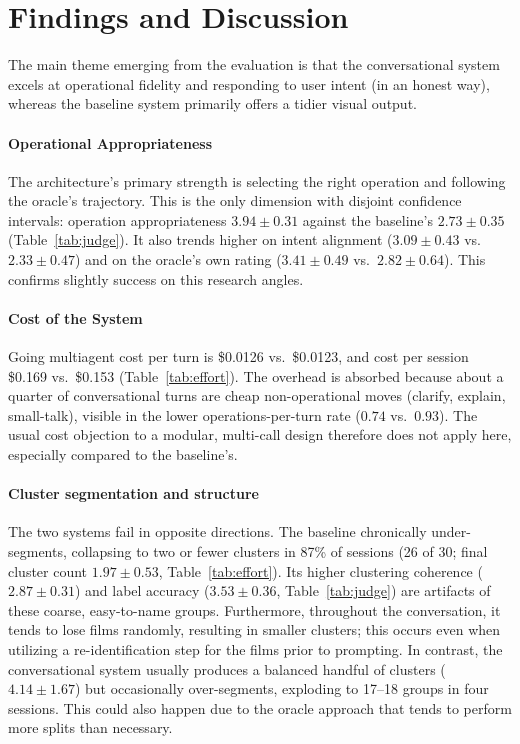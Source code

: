 \section{Findings and Discussion}\label{sec:findings}
The main theme emerging from the evaluation is that the conversational system excels at operational fidelity and responding to user intent (in an honest way), whereas the baseline system primarily offers a tidier visual output.

\paragraph{Operational Appropriateness}
The architecture's primary strength is selecting the right operation and following the oracle's trajectory.
This is the only dimension with disjoint confidence intervals: operation appropriateness $3.94\pm0.31$ against the baseline's $2.73\pm0.35$ (Table~\ref{tab:judge}).
It also trends higher on intent alignment ($3.09\pm0.43$ vs.\ $2.33\pm0.47$) and on the oracle's own rating ($3.41\pm0.49$ vs.\ $2.82\pm0.64$).
This confirms slightly success on this research angles.

\paragraph{Cost of the System}
Going multiagent cost per turn is \$0.0126 vs.\ \$0.0123, and cost per session \$0.169 vs.\ \$0.153 (Table~\ref{tab:effort}).
The overhead is absorbed because about a quarter of conversational turns are cheap non-operational moves (clarify, explain, small-talk), visible in the lower operations-per-turn rate ($0.74$ vs.\ $0.93$).
The usual cost objection to a modular, multi-call design therefore does not apply here, especially compared to the baseline's.

\paragraph{Cluster segmentation and structure}
The two systems fail in opposite directions. 
The baseline chronically under-segments, collapsing to two or fewer clusters in 87\% of sessions (26 of 30; final cluster count $1.97 \pm 0.53$, Table~\ref{tab:effort}). 
Its higher clustering coherence ($2.87 \pm 0.31$) and label accuracy ($3.53 \pm 0.36$, Table~\ref{tab:judge}) are artifacts of these coarse, easy-to-name groups.
Furthermore, throughout the conversation, it tends to lose films randomly, resulting in smaller clusters; this occurs even when utilizing a re-identification step for the films prior to prompting.
In contrast, the conversational system usually produces a balanced handful of clusters ($4.14 \pm 1.67$) but occasionally over-segments, exploding to 17--18 groups in four sessions.
This could also happen due to the oracle approach that tends to perform more splits than necessary.

